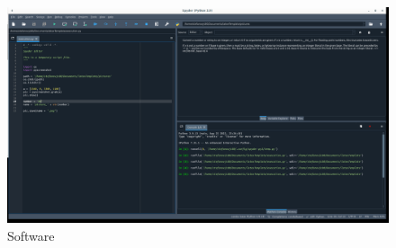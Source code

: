 \begin{figure}[h!]		
	\centering
   	\includegraphics[width=8.0in]{pictures/picture_01.png}%
  	\caption{Software}
   	\label{fig:graficoST_unAcce}
\end{figure}